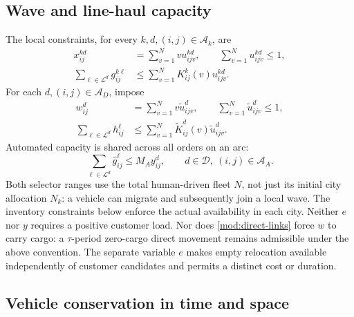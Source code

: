 \subsection{Wave and line-haul capacity}

The local constraints, for every $k,d,(i,j)\in\mathcal A_k$, are
\begin{equation}
 \begin{aligned}
 x_{ij}^{kd}&=\sum_{v=1}^N v u_{ijv}^{kd},\qquad
 \sum_{v=1}^N u_{ijv}^{kd}\leq1,\\
 \sum_{\ell\in\mathcal L^d}g_{ij}^{k\ell}
 &\leq\sum_{v=1}^N K^k_{ij}(v)u_{ijv}^{kd}.
 \end{aligned}
 \label{mod:local-links}
\end{equation}
For each $d,(i,j)\in\mathcal A_D$, impose
\begin{equation}
 \begin{aligned}
 w_{ij}^d&=\sum_{v=1}^N v\widetilde u_{ijv}^d,\qquad
 \sum_{v=1}^N\widetilde u_{ijv}^d\leq1,\\
 \sum_{\ell\in\mathcal L^d}h_{ij}^{\ell}
 &\leq\sum_{v=1}^N\widetilde K^d_{ij}(v)\widetilde u_{ijv}^d.
 \end{aligned}
 \label{mod:direct-links}
\end{equation}
Automated capacity is shared across all orders on an arc:
\begin{equation}
 \sum_{\ell\in\mathcal L^d}\widehat g_{ij}^{\ell}
 \leq M_A y_{ij}^d,
 \qquad d\in\mathcal D,\ (i,j)\in\mathcal A_A.
 \label{mod:auto-capacity}
\end{equation}
Both selector ranges use the total human-driven fleet $N$, not just its
initial city allocation $N_k$: a vehicle can migrate and subsequently join
a local wave. The inventory constraints below enforce the actual
availability in each city. Neither $e$ nor $y$ requires a positive customer
load. Nor does \eqref{mod:direct-links} force $w$ to carry cargo: a
$\tau$-period zero-cargo direct movement remains admissible under the above
convention. The separate variable $e$ makes empty relocation available
independently of customer candidates and permits a distinct cost or duration.

\subsection{Vehicle conservation in time and space}

